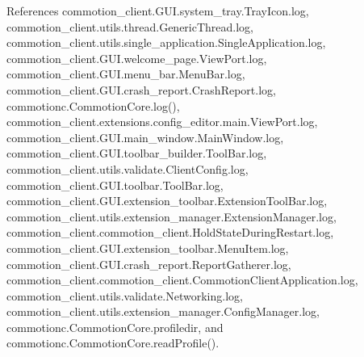 References commotion\-\_\-client.\-G\-U\-I.\-system\-\_\-tray.\-Tray\-Icon.\-log, commotion\-\_\-client.\-utils.\-thread.\-Generic\-Thread.\-log, commotion\-\_\-client.\-utils.\-single\-\_\-application.\-Single\-Application.\-log, commotion\-\_\-client.\-G\-U\-I.\-welcome\-\_\-page.\-View\-Port.\-log, commotion\-\_\-client.\-G\-U\-I.\-menu\-\_\-bar.\-Menu\-Bar.\-log, commotion\-\_\-client.\-G\-U\-I.\-crash\-\_\-report.\-Crash\-Report.\-log, commotionc.\-Commotion\-Core.\-log(), commotion\-\_\-client.\-extensions.\-config\-\_\-editor.\-main.\-View\-Port.\-log, commotion\-\_\-client.\-G\-U\-I.\-main\-\_\-window.\-Main\-Window.\-log, commotion\-\_\-client.\-G\-U\-I.\-toolbar\-\_\-builder.\-Tool\-Bar.\-log, commotion\-\_\-client.\-utils.\-validate.\-Client\-Config.\-log, commotion\-\_\-client.\-G\-U\-I.\-toolbar.\-Tool\-Bar.\-log, commotion\-\_\-client.\-G\-U\-I.\-extension\-\_\-toolbar.\-Extension\-Tool\-Bar.\-log, commotion\-\_\-client.\-utils.\-extension\-\_\-manager.\-Extension\-Manager.\-log, commotion\-\_\-client.\-commotion\-\_\-client.\-Hold\-State\-During\-Restart.\-log, commotion\-\_\-client.\-G\-U\-I.\-extension\-\_\-toolbar.\-Menu\-Item.\-log, commotion\-\_\-client.\-G\-U\-I.\-crash\-\_\-report.\-Report\-Gatherer.\-log, commotion\-\_\-client.\-commotion\-\_\-client.\-Commotion\-Client\-Application.\-log, commotion\-\_\-client.\-utils.\-validate.\-Networking.\-log, commotion\-\_\-client.\-utils.\-extension\-\_\-manager.\-Config\-Manager.\-log, commotionc.\-Commotion\-Core.\-profiledir, and commotionc.\-Commotion\-Core.\-read\-Profile().


